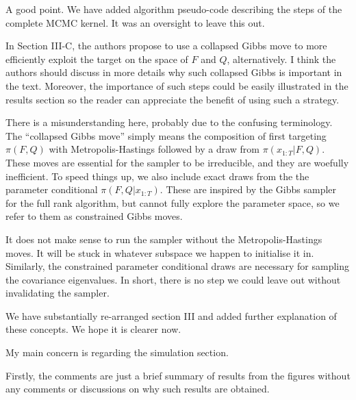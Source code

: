 \documentclass{article}
\newenvironment{review}[0]{\begin{itshape}\color{Gray}\noindent}{\end{itshape}\vspace{0.4cm}}
\newenvironment{response}[0]{\noindent}{\vspace{0.4cm}}
\begin{document}
\begin{response}
 A good point. We have added algorithm pseudo-code describing the steps of the complete MCMC kernel. It was an oversight to leave this out.
\end{response}

\begin{review}
In Section III-C, the authors propose to use a collapsed Gibbs move to more efficiently exploit the target on the space of $F$ and $Q$, alternatively. I think the authors should discuss in more details why such collapsed Gibbs is important in the text. Moreover, the importance of such steps could be easily illustrated in the results section so the reader can appreciate the benefit of using such a strategy.
\end{review}

\begin{response}
 There is a misunderstanding here, probably due to the confusing terminology. The ``collapsed Gibbs move'' simply means the composition of first targeting $\pi(F, Q)$ with Metropolis-Hastings followed by a draw from $\pi(x_{1:T}|F, Q)$. These moves are essential for the sampler to be irreducible, and they are woefully inefficient. To speed things up, we also include exact draws from the the parameter conditional $\pi(F, Q|x_{1:T})$. These are inspired by the Gibbs sampler for the full rank algorithm, but cannot fully explore the parameter space, so we refer to them as constrained Gibbs moves.
 
 It does not make sense to run the sampler without the Metropolis-Hastings moves. It will be stuck in whatever subspace we happen to initialise it in. Similarly, the constrained parameter conditional draws are necessary for sampling the covariance eigenvalues. In short, there is no step we could leave out without invalidating the sampler.
 
 We have substantially re-arranged section III and added further explanation of these concepts. We hope it is clearer now.
\end{response}

\begin{review}
My main concern is regarding the simulation section.

Firstly, the comments are just a brief summary of results from the figures without any comments or discussions on why such results are obtained.
\end{review}
\end{document}
